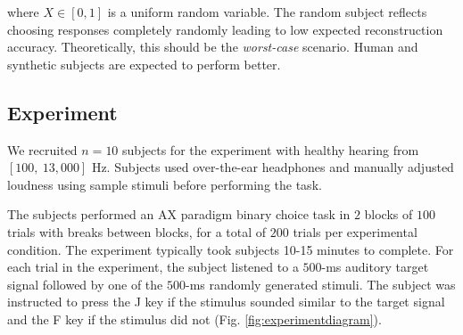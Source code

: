 \documentclass[journal]{IEEEtran}
\newcommand{\eg}{\textit{e}.\textit{g}.\ }
\newcommand{\cf}{\textit{cf}.\ }
\begin{document}
where $X \in [0, 1]$ is a uniform random variable.
The random subject reflects choosing responses completely randomly \textemdash{}
leading to low expected reconstruction accuracy.
Theoretically, this should be the \textit{worst-case} scenario.
Human and synthetic subjects are expected to perform better.







\subsection{Experiment}

We recruited $n=10$ subjects for the experiment
with healthy hearing from $[100,~13,000]$ Hz.
Subjects used over-the-ear headphones
and manually adjusted loudness
using sample stimuli before performing the task.

The subjects performed an AX paradigm binary choice task
in $2$ blocks of $100$ trials with breaks between blocks,
for a total of $200$ trials per experimental condition.
The experiment typically took subjects 10-15 minutes to complete.
For each trial in the experiment,
the subject listened to a $500$-ms auditory target signal
followed by one of the $500$-ms randomly generated stimuli.
The subject was instructed to press the J key if the stimulus sounded similar to the target signal
and the F key if the stimulus did not (Fig. \ref{fig:experimentdiagram}).
\end{document}

